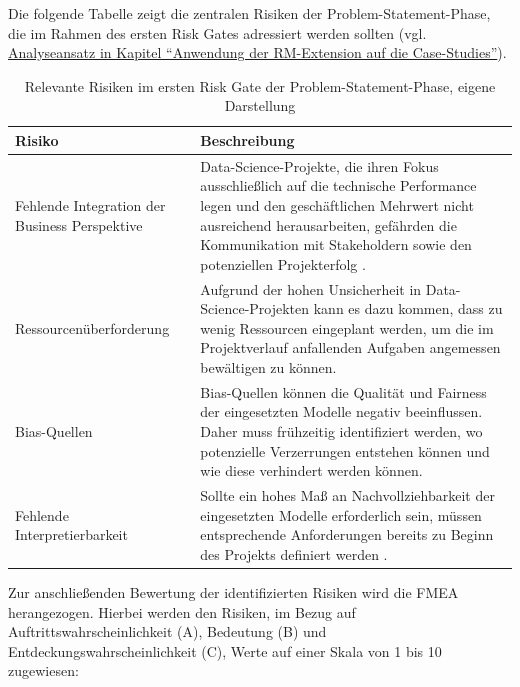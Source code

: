 Die folgende Tabelle zeigt die zentralen Risiken der Problem-Statement-Phase, 
die im Rahmen des ersten Risk Gates adressiert werden sollten (vgl. \hyperref[sec:analyseansatz]{Analyseansatz in Kapitel \enquote{Anwendung der RM-Extension auf die Case-Studies}}).

\begin{table}[!htbp]
\centering
\renewcommand{\arraystretch}{1.3}
\begin{tabular}{|p{5cm}|p{10cm}|}
\hline
\textbf{Risiko} & \textbf{Beschreibung} \\ \hline

Fehlende Integration der Business Perspektive 
& Data-Science-Projekte, die ihren Fokus ausschließlich auf die technische Performance legen 
und den geschäftlichen Mehrwert nicht ausreichend herausarbeiten, gefährden die Kommunikation 
mit Stakeholdern sowie den potenziellen Projekterfolg \cite{Martinez_2021}. \\ \hline

Ressourcen\-überforderung
& Aufgrund der hohen Unsicherheit in Data-Science-Projekten kann es dazu kommen, dass zu wenig 
Ressourcen eingeplant werden, um die im Projektverlauf anfallenden Aufgaben angemessen bewältigen zu können. \\ \hline

Bias-Quellen
& Bias-Quellen können die Qualität und Fairness der eingesetzten Modelle negativ beeinflussen. 
Daher muss frühzeitig identifiziert werden, wo potenzielle Verzerrungen entstehen können und wie diese verhindert werden können. \\ \hline

Fehlende Interpretierbarkeit
& Sollte ein hohes Maß an Nachvollziehbarkeit der eingesetzten Modelle erforderlich sein, 
müssen entsprechende Anforderungen bereits zu Beginn des Projekts definiert werden \cite{schulz_dasc-pm_2022}. \\ \hline

\end{tabular}
\caption{Relevante Risiken im ersten Risk Gate der Problem-Statement-Phase, eigene Darstellung}
\label{tab:risiken_problem_statement}
\end{table}

Zur anschließenden Bewertung der identifizierten Risiken wird die 
FMEA herangezogen. 
Hierbei werden den Risiken, im Bezug auf Auftrittswahrscheinlichkeit (A), Bedeutung (B) 
und Entdeckungswahrscheinlichkeit (C), Werte auf einer Skala 
von 1 bis 10 zugewiesen:

